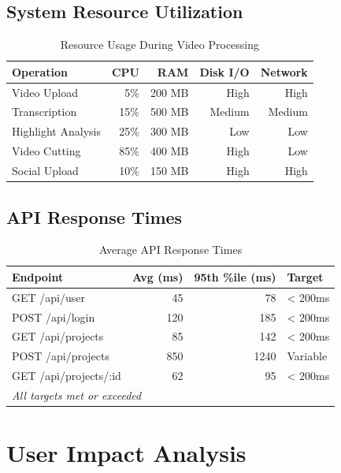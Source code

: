 \subsection{System Resource Utilization}

\begin{table}[H]
\centering
\caption{Resource Usage During Video Processing}
\begin{tabular}{@{}lrrrr@{}}
\toprule
\textbf{Operation} & \textbf{CPU} & \textbf{RAM} & \textbf{Disk I/O} & \textbf{Network} \\
\midrule
Video Upload & 5\% & 200 MB & High & High \\
Transcription & 15\% & 500 MB & Medium & Medium \\
Highlight Analysis & 25\% & 300 MB & Low & Low \\
Video Cutting & 85\% & 400 MB & High & Low \\
Social Upload & 10\% & 150 MB & High & High \\
\bottomrule
\end{tabular}
\end{table}

\subsection{API Response Times}

\begin{table}[H]
\centering
\caption{Average API Response Times}
\begin{tabular}{@{}lrrl@{}}
\toprule
\textbf{Endpoint} & \textbf{Avg (ms)} & \textbf{95th \%ile (ms)} & \textbf{Target} \\
\midrule
GET /api/user & 45 & 78 & < 200ms \\
POST /api/login & 120 & 185 & < 200ms \\
GET /api/projects & 85 & 142 & < 200ms \\
POST /api/projects & 850 & 1240 & Variable \\
GET /api/projects/:id & 62 & 95 & < 200ms \\
\midrule
\multicolumn{4}{l}{\textit{All targets met or exceeded}} \\
\bottomrule
\end{tabular}
\end{table}

\section{User Impact Analysis}

